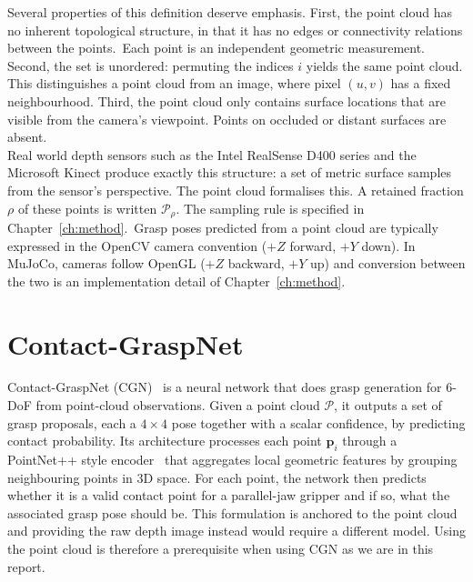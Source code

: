 \documentclass[11pt,a4paper]{report}
\begin{document}
\noindent Several properties of this definition deserve emphasis.  First, the point cloud
has no inherent topological structure, in that it has no edges or connectivity
relations between the points.~Each point is an independent geometric measurement.
Second, the set is unordered: permuting the indices $i$ yields the same point cloud.
This distinguishes a point cloud from an image, where pixel $(u,v)$ has a fixed
neighbourhood.  Third, the point cloud only contains surface locations that are visible from the camera's viewpoint.  Points on occluded or distant surfaces are absent. \\

\noindent Real world depth sensors
such as the Intel RealSense D400 series and the Microsoft Kinect produce exactly
this structure: a set of metric surface samples from the sensor's perspective.
The point cloud formalises this. A retained fraction $\rho$ of these points is written $\mathcal{P}_\rho$. The sampling rule is specified in Chapter~\ref{ch:method}.~Grasp poses predicted from a point cloud are typically expressed in the OpenCV camera convention ($+Z$ forward, $+Y$ down). In MuJoCo, cameras follow OpenGL ($+Z$ backward, $+Y$ up) and conversion between the two is an implementation detail of Chapter~\ref{ch:method}.

\section{Contact-GraspNet}
\label{sec:bg_cgn}

Contact-GraspNet (CGN)~\cite{sundermeyer2021contactgraspnet} is a neural network that does grasp generation for 6-DoF from point-cloud observations. Given a point cloud $\mathcal{P}$, it outputs a set of grasp proposals, each a $4\times4$ pose together with a scalar confidence, by predicting contact probability. Its architecture processes each point $\mathbf{p}_i$ through a PointNet++ style encoder~\cite{qi2017pointnetpp} that aggregates local geometric features by grouping neighbouring points in 3D space. For each point, the network then predicts whether it is a valid contact point for a parallel-jaw gripper and if so, what the associated grasp pose should be. This formulation is anchored to the point cloud and providing the raw depth image instead would require a different model. Using the point cloud is therefore a prerequisite when using CGN as we are in this report.\\
\end{document}
